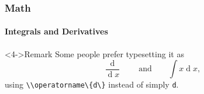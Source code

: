 \begin{frame}
    \frametitle{Math}
    \framesubtitle{Integrals and Derivatives}
    \begin{alertblock}<4->{\blockstrut Remark}
        Some people prefer typesetting it as
        \[
            \frac{\operatorname{d} }{\operatorname{d} x}
            \qquad
            \text{and}
            \qquad
            \int x \operatorname{d} x,
        \]
        using \lstinline|\\operatorname\{d\}| instead of simply \lstinline|d|.
    \end{alertblock}
\end{frame}